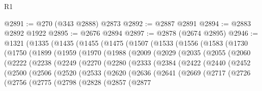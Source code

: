 \begin{lexlean}{R1}
\begin{coremodule}
@2891 := @270 (@343 @2888) @2873
@2892 := @2887 @2891
@2894 := @2883 @2892 @1922
@2895 := @2676 @2894
@2897 := @2878 (@2674 @2895)
@2946 := @1321
    (@1335
      (@1435
        (@1455
          (@1475
            (@1507
              (@1533
                (@1556
                  (@1583
                    (@1730
                      (@1750
                        (@1899
                          (@1959
                            (@1970
                              (@1988
                                (@2009
                                  (@2029
                                    (@2035
                                      (@2055
                                        (@2060
                                          (@2222
                                            (@2238
                                              (@2249
                                                (@2270
                                                  (@2280
                                                    (@2333
                                                      (@2384
                                                        (@2422
                                                          (@2440
                                                            (@2452
                                                              (@2500
                                                                (@2506
                                                                  (@2520
                                                                    (@2533
                                                                      (@2620
                                                                        (@2636
                                                                          (@2641
                                                                            (@2669
                                                                              (@2717
                                                                                (@2726
                                                                                  (@2756
                                                                                    (@2775
                                                                                      (@2798
                                                                                        (@2828
                                                                                          (@2857
                                                                                            (@2877

\end{coremodule}
\end{lexlean}
